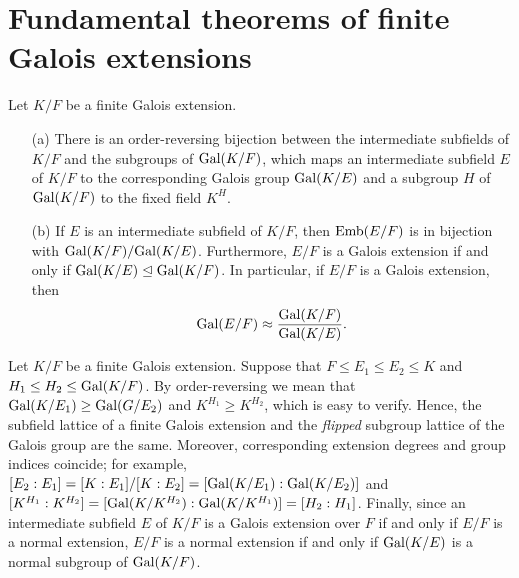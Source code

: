 \section{Fundamental theorems of finite Galois extensions}

\begin{thm}\label{Galois'_thm_1}
    Let $K/F$ be a finite Galois extension.
    \begin{enumerate}
        \item[(a)]
        {
            There is an order-reversing bijection between the intermediate subfields of $K/F$ and the subgroups of ${\textrm{Gal}({K/F})}$, which maps an intermediate subfield $E$ of $K/F$ to the corresponding Galois group ${\textrm{Gal}({K/E})}$ and a subgroup $H$ of ${\textrm{Gal}({K/F})}$ to the fixed field $K^H$.
        }
        \item[(b)]
        {
            If $E$ is an intermediate subfield of $K/F$, then ${\textrm{Emb}({E/F})}$ is in bijection with ${\textrm{Gal}({K/F})}/{\textrm{Gal}({K/E})}$.
            Furthermore, $E/F$ is a Galois extension if and only if ${\textrm{Gal}({K/E})}\trianglelefteq{\textrm{Gal}({K/F})}$.
            In particular, if $E/F$ is a Galois extension, then
            \begin{align*}
                {\textrm{Gal}({E/F})}\approx\frac{{\textrm{Gal}({K/F})}}{{\textrm{Gal}({K/E})}}.
            \end{align*}
        }
    \end{enumerate}
\end{thm}
\begin{rmk}
    Let $K/F$ be a finite Galois extension.
    Suppose that $F\leq E_1\leq E_2\leq K$ and $H_1\leq H_2\leq {\textrm{Gal}({K/F})}$.
    By order-reversing we mean that ${\textrm{Gal}({K/E_1})}\geq{\textrm{Gal}({G/E_2})}$ and $K^{H_1}\geq K^{H_2}$, which is easy to verify.
    Hence, the subfield lattice of a finite Galois extension and the \textit{flipped} subgroup lattice of the Galois group are the same.
    Moreover, corresponding extension degrees and group indices coincide; for example, $[E_2: E_1]=[K:E_1]/[K:E_2]=[{\textrm{Gal}({K/E_1})}: {\textrm{Gal}({K/E_2})}]$ and $[K^{H_1}: K^{H_2}]=[{\textrm{Gal}({K/K^{H_2}})}: {\textrm{Gal}({K/K^{H_1}})}]=[H_2: H_1]$.
    Finally, since an intermediate subfield $E$ of $K/F$ is a Galois extension over $F$ if and only if $E/F$ is a normal extension, $E/F$ is a normal extension if and only if ${\textrm{Gal}({K/E})}$ is a normal subgroup of ${\textrm{Gal}({K/F})}$.
\end{rmk}

